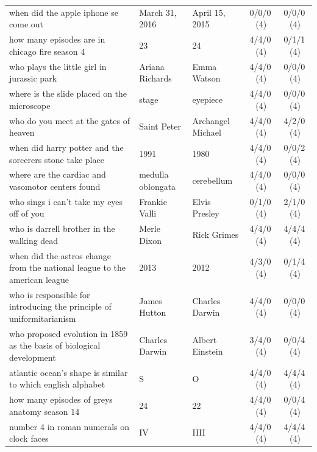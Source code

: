 \begin{longtable}{@{}p{6.6cm}p{2.9cm}p{2.9cm}cc@{}}
when did the apple iphone se come out & March 31, 2016 & April 15, 2015 & 0/0/0\,\footnotesize(4) & 0/0/0\,\footnotesize(4) \\
\rowcolor{neutralgray}
how many episodes are in chicago fire season 4 & 23 & 24 & 4/4/0\,\footnotesize(4) & 0/1/1\,\footnotesize(4) \\
who plays the little girl in jurassic park & Ariana Richards & Emma Watson & 4/4/0\,\footnotesize(4) & 0/0/0\,\footnotesize(4) \\
\rowcolor{neutralgray}
where is the slide placed on the microscope & stage & eyepiece & 4/4/0\,\footnotesize(4) & 0/0/0\,\footnotesize(4) \\
who do you meet at the gates of heaven & Saint Peter & Archangel Michael & 4/4/0\,\footnotesize(4) & 4/2/0\,\footnotesize(4) \\
\rowcolor{neutralgray}
when did harry potter and the sorcerers stone take place & 1991 & 1980 & 4/4/0\,\footnotesize(4) & 0/0/2\,\footnotesize(4) \\
where are the cardiac and vasomotor centers found & medulla oblongata & cerebellum & 4/4/0\,\footnotesize(4) & 0/0/0\,\footnotesize(4) \\
\rowcolor{neutralgray}
who sings i can't take my eyes off of you & Frankie Valli & Elvis Presley & 0/1/0\,\footnotesize(4) & 2/1/0\,\footnotesize(4) \\
who is darrell brother in the walking dead & Merle Dixon & Rick Grimes & 4/4/0\,\footnotesize(4) & 4/4/4\,\footnotesize(4) \\
\rowcolor{neutralgray}
when did the astros change from the national league to the american league & 2013 & 2012 & 4/3/0\,\footnotesize(4) & 0/1/4\,\footnotesize(4) \\
who is responsible for introducing the principle of uniformitarianism & James Hutton & Charles Darwin & 4/4/0\,\footnotesize(4) & 0/0/0\,\footnotesize(4) \\
\rowcolor{neutralgray}
who proposed evolution in 1859 as the basis of biological development & Charles Darwin & Albert Einstein & 3/4/0\,\footnotesize(4) & 0/0/4\,\footnotesize(4) \\
atlantic ocean's shape is similar to which english alphabet & S & O & 4/4/0\,\footnotesize(4) & 4/4/4\,\footnotesize(4) \\
\rowcolor{neutralgray}
how many episodes of greys anatomy season 14 & 24 & 22 & 4/4/0\,\footnotesize(4) & 0/0/4\,\footnotesize(4) \\
number 4 in roman numerals on clock faces & IV & IIII & 4/4/0\,\footnotesize(4) & 4/4/4\,\footnotesize(4) \\

\end{longtable}
